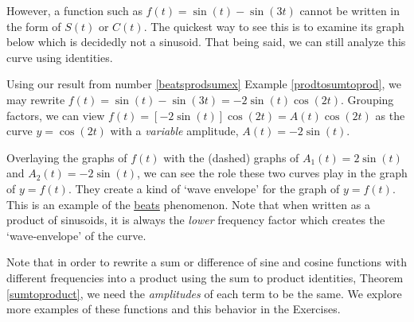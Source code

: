 \documentclass{ximera}
\begin{document}
 

However, a function such as  $f(t) = \sin(t) - \sin(3t)$ cannot be written in the form of $S(t)$ or $C(t)$. The quickest way to see this is to examine its graph below which is decidedly not a sinusoid.  That being said, we can still analyze this curve using identities.


\begin{center}
\end{center}


 Using our result from  number \ref{beatsprodsumex} Example \ref{prodtosumtoprod}, we may rewrite $f(t) = \sin(t) - \sin(3t) = -2 \sin(t) \cos(2t)$.  Grouping factors, we can view $f(t) = [ -2 \sin(t) ] \cos(2t) = A(t) \cos(2t)$ as the curve $y = \cos(2t)$ with a \textit{variable} amplitude, $A(t) = -2 \sin(t)$. 
 
 Overlaying the graphs of $f(t)$ with the (dashed) graphs of $A_{1}(t) = 2 \sin(t)$ and $A_{2}(t) = -2 \sin(t)$, we can see the role these two curves play in the graph of $y = f(t)$.  They create a kind of `wave envelope' for the graph of $y = f(t)$.  This is an example of the \href{https://en.wikipedia.org/wiki/Beat_(acoustics)}{\underline{beats}} phenomenon.  Note that when written as a product of sinusoids, it is always the \textit{lower} frequency factor which creates the `wave-envelope' of the curve.
 
  
 
Note that  in order to rewrite a sum or difference of sine and cosine functions with different frequencies into a product  using the sum to product identities, Theorem \ref{sumtoproduct}, we need the \textit{amplitudes} of each term to be the same.  We explore more examples of these functions and this behavior in the Exercises.
  



\closegraphsfile
\end{document}
